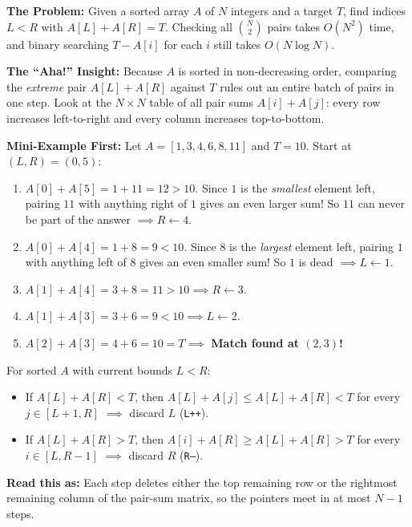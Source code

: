 \documentclass[11pt,a4paper]{article}
\theoremstyle{definition}
\newcommand{\painbeat}{\textbf{\color{accentamber}The Problem:} }
\newcommand{\ahabeat}{\textbf{\color{accentteal}The ``Aha!'' Insight:} }
\newcommand{\examplebeat}{\textbf{\color{primaryblue}Mini-Example First:} }
\begin{document}
\painbeat Given a sorted array $A$ of $N$ integers and a target $T$, find indices $L < R$ with $A[L] + A[R] = T$. Checking all $\binom{N}{2}$ pairs takes $O(N^2)$ time, and binary searching $T - A[i]$ for each $i$ still takes $O(N \log N)$.

\ahabeat Because $A$ is sorted in non-decreasing order, comparing the \emph{extreme} pair $A[L] + A[R]$ against $T$ rules out an entire batch of pairs in one step. Look at the $N \times N$ table of all pair sums $A[i] + A[j]$: every row increases left-to-right and every column increases top-to-bottom.

\examplebeat Let $A = [1, 3, 4, 6, 8, 11]$ and $T = 10$. Start at $(L, R) = (0, 5)$:
\begin{enumerate}[itemsep=2pt, topsep=2pt]
    \item $A[0] + A[5] = 1 + 11 = 12 > 10$. Since $1$ is the \emph{smallest} element left, pairing $11$ with anything right of $1$ gives an even larger sum! So $11$ can never be part of the answer $\implies R \leftarrow 4$.
    \item $A[0] + A[4] = 1 + 8 = 9 < 10$. Since $8$ is the \emph{largest} element left, pairing $1$ with anything left of $8$ gives an even smaller sum! So $1$ is dead $\implies L \leftarrow 1$.
    \item $A[1] + A[4] = 3 + 8 = 11 > 10 \implies R \leftarrow 3$.
    \item $A[1] + A[3] = 3 + 6 = 9 < 10 \implies L \leftarrow 2$.
    \item $A[2] + A[3] = 4 + 6 = 10 = T \implies$ \textbf{Match found at $(2, 3)$!}
\end{enumerate}

\begin{formulabox}
For sorted $A$ with current bounds $L < R$:
\begin{itemize}[itemsep=1pt, topsep=2pt]
    \item If $A[L] + A[R] < T$, then $A[L] + A[j] \le A[L] + A[R] < T$ for every $j \in [L+1, R]$ $\implies$ discard $L$ (\texttt{L++}).
    \item If $A[L] + A[R] > T$, then $A[i] + A[R] \ge A[L] + A[R] > T$ for every $i \in [L, R-1]$ $\implies$ discard $R$ (\texttt{R--}).
\end{itemize}
\textbf{Read this as:} Each step deletes either the top remaining row or the rightmost remaining column of the pair-sum matrix, so the pointers meet in at most $N - 1$ steps.
\end{formulabox}
\end{document}
